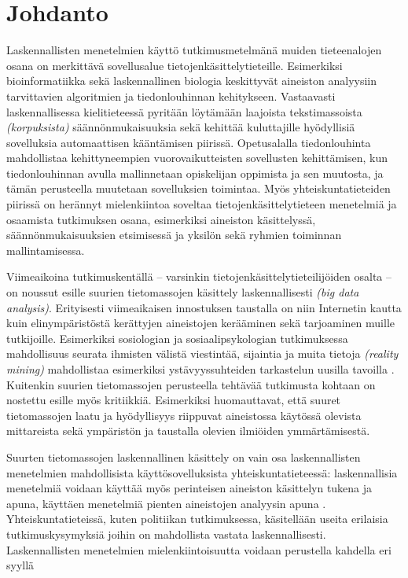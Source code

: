 \documentclass[finnish,gradu,twoside,12pt]{tktltiki}
\begin{document}
\mytableofcontents

\section{Johdanto}

Laskennallisten menetelmien käyttö tutkimusmetelmänä muiden tieteenalojen osana on merkittävä sovellusalue tietojenkäsittelytieteille. Esimerkiksi bioinformatiikka sekä laskennallinen biologia keskittyvät aineiston analyysiin tarvittavien algoritmien ja tiedonlouhinnan kehitykseen. Vastaavasti laskennallisessa kielitieteessä pyritään löytämään laajoista tekstimassoista \textit{(korpuksista)} säännönmukaisuuksia sekä kehittää kuluttajille hyödyllisiä sovelluksia automaattisen kääntämisen piirissä. Opetusalalla tiedonlouhinta mahdollistaa kehittyneempien vuorovaikutteisten sovellusten kehittämisen, kun tiedonlouhinnan avulla mallinnetaan opiskelijan oppimista ja sen muutosta, ja tämän perusteella muutetaan sovelluksien toimintaa. Myös yhteiskuntatieteiden piirissä on herännyt mielenkiintoa soveltaa tietojenkäsittelytieteen menetelmiä ja osaamista tutkimuksen osana, esimerkiksi aineiston käsittelyssä, säännönmukaisuuksien etsimisessä ja yksilön sekä ryhmien toiminnan mallintamisessa.

Viimeaikoina tutkimuskentällä -- varsinkin tietojenkäsittelytieteilijöiden osalta -- on noussut esille suurien tietomassojen käsittely laskennallisesti \textit{(big data analysis)}. Erityisesti viimeaikaisen innostuksen taustalla on niin Internetin kautta \citep{adamic05,notess02} kuin elinympäristöstä kerättyjen aineistojen \citep{eagle06,oulasvirta12} kerääminen sekä tarjoaminen muille tutkijoille. Esimerkiksi sosiologian ja sosiaalipsykologian tutkimuksessa mahdollisuus seurata ihmisten välistä viestintää, sijaintia ja muita tietoja \textit{(reality mining)} mahdollistaa esimerkiksi ystävyyssuhteiden tarkastelun uusilla tavoilla \cite{Karikoski2011a,Nelimarkka2012}. Kuitenkin suurien tietomassojen perusteella tehtävää tutkimusta kohtaan on nostettu esille myös kritiikkiä. Esimerkiksi \citet{Boyd2012a} huomauttavat, että suuret tietomassojen laatu ja hyödyllisyys riippuvat aineistossa käytössä olevista mittareista sekä ympäristön ja taustalla olevien ilmiöiden ymmärtämisestä.

Suurten tietomassojen laskennallinen käsittely on vain osa laskennallisten menetelmien mahdollisista käyttösovelluksista yhteiskuntatieteessä: laskennallisia menetelmiä voidaan käyttää myös perinteisen aineiston käsittelyn tukena ja apuna, käyttäen menetelmiä pienten aineistojen analyysin apuna \citep{pertti}. Yhteiskuntatieteissä, kuten politiikan tutkimuksessa, käsitellään useita erilaisia tutkimuskysymyksiä joihin on mahdollista vastata laskennallisesti. Laskennallisten menetelmien mielenkiintoisuutta voidaan perustella kahdella eri syyllä
\end{document}
